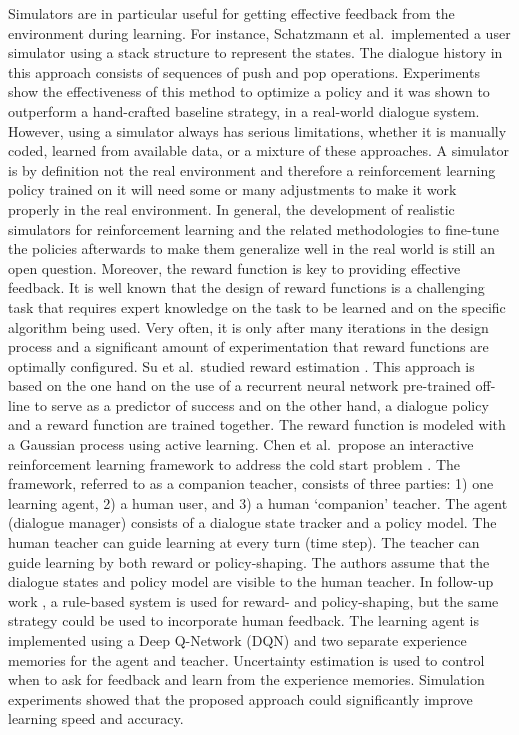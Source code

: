 Simulators are in particular useful for getting effective feedback from the environment during learning. For instance, Schatzmann et al.\  implemented a user simulator using a stack structure to represent the states. The dialogue history in this approach consists of sequences of push and pop operations. Experiments show the effectiveness of this method to optimize a policy and it was shown to outperform a hand-crafted baseline strategy, in a real-world dialogue system. However, using a simulator always has serious limitations, whether it is manually coded, learned from available data, or a mixture of these approaches. A simulator is by definition not the real environment and therefore a reinforcement learning policy trained on it will need some or many adjustments to make it work properly in the real environment. In general, the development of realistic simulators for reinforcement learning and the related methodologies to fine-tune the policies afterwards to make them generalize well in the real world is still an open question. Moreover, the reward function is key to providing effective feedback. It is well known that the design of reward functions is a challenging task that requires expert knowledge on the task to be learned and on the specific algorithm being used. Very often, it is only after many iterations in the design process and a significant amount of experimentation that reward functions are optimally configured. Su et al.\ studied reward estimation . This approach is based on the one hand on the use of a recurrent neural network pre-trained off-line to serve as a predictor of success and on the other hand, a dialogue policy and a reward function are trained together. The reward function is modeled with a Gaussian process using active learning.
Chen et al.\ propose an interactive reinforcement learning framework to address the cold start problem . The framework, referred to as a companion teacher, consists of three parties: 1) one learning agent, 2) a human user, and 3) a human `companion' teacher. The agent (dialogue manager) consists of a dialogue state tracker and a policy model. The human teacher can guide learning at every turn (time step). The teacher can guide learning by both reward or policy-shaping. The authors assume that the dialogue states and policy model are visible to the human teacher. In follow-up work , a rule-based system is used for reward- and policy-shaping, but the same strategy could be used to incorporate human feedback. The learning agent is implemented using a Deep Q-Network (DQN) and two separate experience memories for the agent and teacher. Uncertainty estimation is used to control when to ask for feedback and learn from the experience memories. Simulation experiments showed that the proposed approach could significantly improve learning speed and accuracy.

